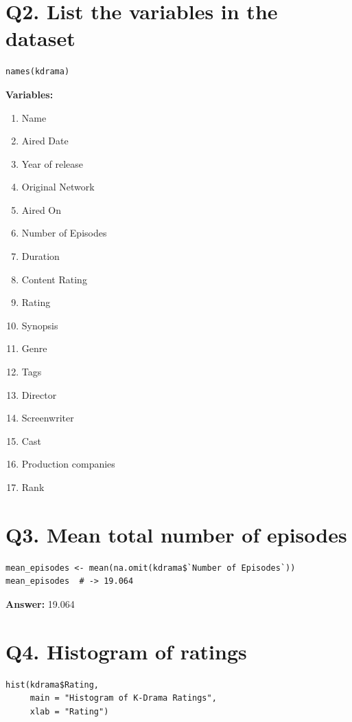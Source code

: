 \documentclass[11pt]{article}
\begin{document}
\section*{Q2. List the variables in the dataset}
\begin{lstlisting}
names(kdrama)
\end{lstlisting}
\noindent
\textbf{Variables:}
\begin{enumerate}[itemsep=1pt, topsep=2pt]
\item Name
\item Aired Date
\item Year of release
\item Original Network
\item Aired On
\item Number of Episodes
\item Duration
\item Content Rating
\item Rating
\item Synopsis
\item Genre
\item Tags
\item Director
\item Screenwriter
\item Cast
\item Production companies
\item Rank
\end{enumerate}

\section*{Q3. Mean total number of episodes}
\begin{lstlisting}
mean_episodes <- mean(na.omit(kdrama$`Number of Episodes`))
mean_episodes  # -> 19.064
\end{lstlisting}
\textbf{Answer:} 19.064

\section*{Q4. Histogram of ratings}
\begin{lstlisting}
hist(kdrama$Rating,
     main = "Histogram of K-Drama Ratings",
     xlab = "Rating")
\end{lstlisting}
\end{document}
